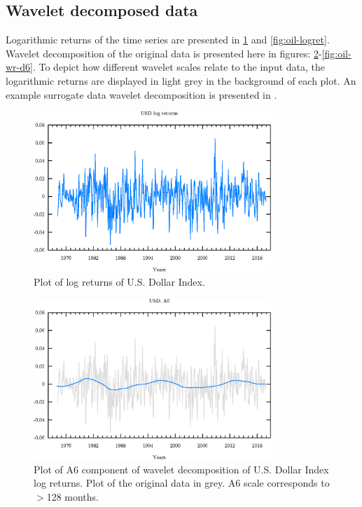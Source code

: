 \subsection{Wavelet decomposed data}
Logarithmic returns of the time series are presented in \ref{fig:usd-logret} and \ref{fig:oil-logret}.
Wavelet decomposition of the original data is presented here in figures: \ref{fig:usd-wr-a6}-\ref{fig:oil-wr-d6}.
To depict how different wavelet scales relate to the input data, the logarithmic returns are displayed in light grey in the background of each plot.
An example surrogate data wavelet decomposition is presented in .

\begin{figure}[h]
\begin{center}
\includegraphics[width=0.8\textwidth]{./code/plot/dollar_logret.eps}
\caption{Plot of log returns of U.S. Dollar Index.}
\label{fig:usd-logret}
\end{center}
\end{figure}

\begin{figure}
\begin{center}
\includegraphics[width=0.8\textwidth]{./code/plot/usd_wr_A6.eps}
\caption{Plot of A6 component of wavelet decomposition of U.S. Dollar Index log returns. 
	Plot of the original data in grey. A6 scale corresponds to $>$128 months.}
\label{fig:usd-wr-a6}
\end{center}
\end{figure}

